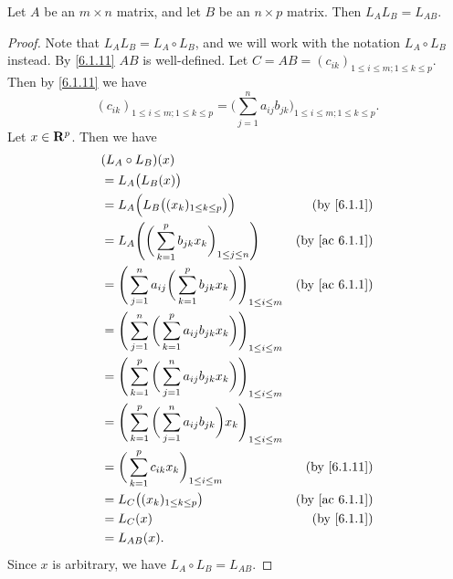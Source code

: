 \begin{lemma}\label{6.1.16}
  Let \(A\) be an \(m \times n\) matrix, and let \(B\) be an \(n \times p\) matrix.
  Then \(L_A L_B = L_{AB}\).
\end{lemma}

\begin{proof}
  Note that \(L_A L_B = L_A \circ L_B\), and we will work with the notation \(L_A \circ L_B\) instead.
  By \cref{6.1.11} \(AB\) is well-defined.
  Let \(C = AB = (c_{ik})_{1 \leq i \leq m ; 1 \leq k \leq p}\).
  Then by \cref{6.1.11} we have
  \[
    (c_{ik})_{1 \leq i \leq m ; 1 \leq k \leq p} = \bigg(\sum_{j = 1}^n a_{ij} b_{jk}\bigg)_{1 \leq i \leq m ; 1 \leq k \leq p}.
  \]
  Let \(x \in \mathbf{R}^p\).
  Then we have
  \begin{align*}
     & (L_A \circ L_B)(x)                                                                                                        \\
     & = L_A\big(L_B(x)\big)                                                                                                     \\
     & = L_A\Big(L_B\big((x_k)_{1 \leq k \leq p}\big)\Big)                                         & \text{(by \cref{6.1.1})}    \\
     & = L_A\Bigg(\bigg(\sum_{k = 1}^p b_{jk} x_k\bigg)_{1 \leq j \leq n}\Bigg)                    & \text{(by \cref{ac 6.1.1})} \\
     & = \Bigg(\sum_{j = 1}^n a_{ij} \bigg(\sum_{k = 1}^p b_{jk} x_k\bigg)\Bigg)_{1 \leq i \leq m} & \text{(by \cref{ac 6.1.1})} \\
     & = \Bigg(\sum_{j = 1}^n \bigg(\sum_{k = 1}^p a_{ij} b_{jk} x_k\bigg)\Bigg)_{1 \leq i \leq m}                               \\
     & = \Bigg(\sum_{k = 1}^p \bigg(\sum_{j = 1}^n a_{ij} b_{jk} x_k\bigg)\Bigg)_{1 \leq i \leq m}                               \\
     & = \Bigg(\sum_{k = 1}^p \bigg(\sum_{j = 1}^n a_{ij} b_{jk}\bigg) x_k\Bigg)_{1 \leq i \leq m}                               \\
     & = \bigg(\sum_{k = 1}^p c_{ik} x_k\bigg)_{1 \leq i \leq m}                                   & \text{(by \cref{6.1.11})}   \\
     & = L_C\big((x_k)_{1 \leq k \leq p}\big)                                                      & \text{(by \cref{ac 6.1.1})} \\
     & = L_C(x)                                                                                    & \text{(by \cref{6.1.1})}    \\
     & = L_{AB}(x).
  \end{align*}
  Since \(x\) is arbitrary, we have \(L_A \circ L_B = L_{AB}\).
\end{proof}


